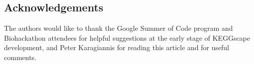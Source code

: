 \documentclass[10pt,a4paper,twocolumn]{article}
\begin{document}
\subsection*{Acknowledgements}
The authors would like to thank the Google Summer of Code program and Biohackathon attendees for helpful suggestions at the early stage of KEGGscape development, and Peter Karagiannis for reading this article and for useful comments.

\nocite{*}
{\small
}







\end{document}
